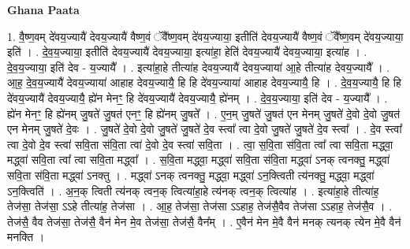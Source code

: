 \documentclass[17pt]{extarticle}
\begin{document}
\textbf{Ghana Paata } \newline

1. वै॒ष्ण॒वम् दे॑वय॒ज्यायै॑ देवय॒ज्यायै॑ वैष्ण॒वं ॅवै᳚ष्ण॒वम् दे॑वय॒ज्याया॒ इतीति॑ देवय॒ज्यायै॑ वैष्ण॒वं ॅवै᳚ष्ण॒वम् दे॑वय॒ज्याया॒ इति॑ । . दे॒व॒य॒ज्याया॒ इतीति॑ देवय॒ज्यायै॑ देवय॒ज्याया॒ इत्या॑हा॒ हेति॑ देवय॒ज्यायै॑ देवय॒ज्याया॒ इत्या॑ह । . दे॒व॒य॒ज्याया॒ इति॑ देव - य॒ज्यायै᳚ । . इत्या॑हा॒हे तीत्या॑ह देवय॒ज्यायै॑ देवय॒ज्याया॑ आ॒हे तीत्या॑ह देवय॒ज्यायै᳚ । . आ॒ह॒ दे॒व॒य॒ज्यायै॑ देवय॒ज्याया॑ आहाह देवय॒ज्यायै॒ हि हि दे॑वय॒ज्याया॑ आहाह देवय॒ज्यायै॒ हि । . दे॒व॒य॒ज्यायै॒ हि हि दे॑वय॒ज्यायै॑ देवय॒ज्यायै॒ ह्ये॑न मेनꣳ॒॒ हि दे॑वय॒ज्यायै॑ देवय॒ज्यायै॒ ह्ये॑नम् । . दे॒व॒य॒ज्याया॒ इति॑ देव - य॒ज्यायै᳚ । . ह्ये॑न मेनꣳ॒॒ हि ह्ये॑नम् जु॒षते॑ जु॒षत॑ एनꣳ॒॒ हि ह्ये॑नम् जु॒षते᳚ । . ए॒न॒म् जु॒षते॑ जु॒षत॑ एन मेनम् जु॒षते॑ दे॒वो दे॒वो जु॒षत॑ एन मेनम् जु॒षते॑ दे॒वः । . जु॒षते॑ दे॒वो दे॒वो जु॒षते॑ जु॒षते॑ दे॒व स्त्वा᳚ त्वा दे॒वो जु॒षते॑ जु॒षते॑ दे॒व स्त्वा᳚ । . दे॒व स्त्वा᳚ त्वा दे॒वो दे॒व स्त्वा॑ सवि॒ता स॑वि॒ता त्वा॑ दे॒वो दे॒व स्त्वा॑ सवि॒ता । . त्वा॒ स॒वि॒ता स॑वि॒ता त्वा᳚ त्वा सवि॒ता मद्ध्वा॒ मद्ध्वा॑ सवि॒ता त्वा᳚ त्वा सवि॒ता मद्ध्वा᳚ । . स॒वि॒ता मद्ध्वा॒ मद्ध्वा॑ सवि॒ता स॑वि॒ता मद्ध्वा॑ ऽनक् त्वनक्तु॒ मद्ध्वा॑ सवि॒ता स॑वि॒ता मद्ध्वा॑ ऽनक्तु । . मद्ध्वा॑ ऽनक् त्वनक्तु॒ मद्ध्वा॒ मद्ध्वा॑ ऽन॒क्त्विती त्य॑नक्तु॒ मद्ध्वा॒ मद्ध्वा॑ ऽन॒क्त्विति॑ । . अ॒न॒क् त्विती त्य॑नक् त्वन॒क् त्वित्या॑हा॒हे त्य॑नक् त्वन॒क् त्वित्या॑ह । . इत्या॑हा॒हे तीत्या॑ह॒ तेज॑सा॒ तेज॑सा॒ ऽऽहे तीत्या॑ह॒ तेज॑सा । . आ॒ह॒ तेज॑सा॒ तेज॑सा ऽऽहाह॒ तेज॑सै॒वैव तेज॑सा ऽऽहाह॒ तेज॑सै॒व । . तेज॑सै॒ वैव तेज॑सा॒ तेज॑सै॒ वैन॑ मेन मे॒व तेज॑सा॒ तेज॑सै॒ वैन᳚म् । . ए॒वैन॑ मेन मे॒वै वैन॑ मनक् त्यनक् त्येन मे॒वै वैन॑ मनक्ति । \newline
\end{document}
